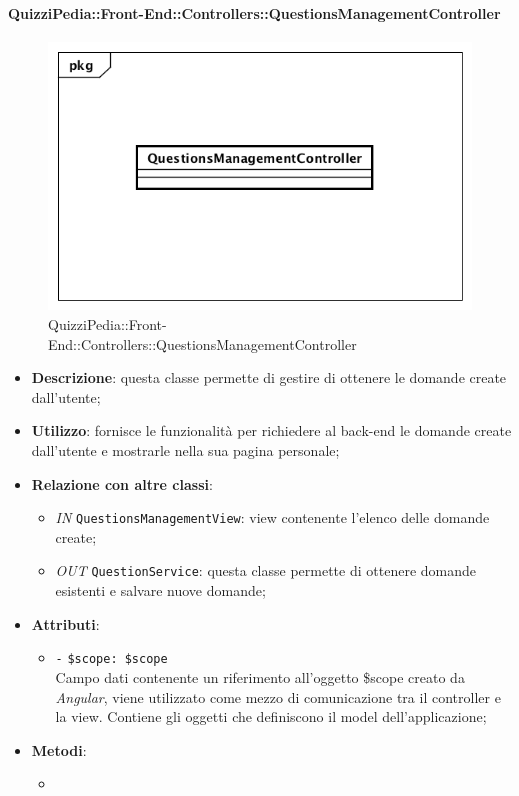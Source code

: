 \paragraph{QuizziPedia::Front-End::Controllers::QuestionsManagementController}
\begin{figure}
	\centering
	\includegraphics[scale=0.45]{UML/Classi/Front-End/QuizziPedia_Front-end_Controller_QuestionsManagementController.png}
	\caption{QuizziPedia::Front-End::Controllers::QuestionsManagementController}
\end{figure}
\begin{itemize}
	\item \textbf{Descrizione}: questa classe permette di gestire di ottenere le domande create dall'utente;
	\item \textbf{Utilizzo}: fornisce le funzionalità per richiedere al back-end le domande create dall'utente e mostrarle nella sua pagina personale; 
	\item \textbf{Relazione con altre classi}:
	\begin{itemize}
		\item \textit{IN} \texttt{QuestionsManagementView}: view contenente l'elenco delle domande create; 
		\item \textit{OUT} \texttt{QuestionService}: questa classe permette di ottenere domande esistenti e salvare nuove domande;
	\end{itemize}
	\item \textbf{Attributi}:
	\begin{itemize}
		\item \texttt{-} \texttt{\$scope: \$scope} \\
		Campo dati contenente un riferimento all’oggetto \$scope creato da \textit{Angular}, viene utilizzato come mezzo di comunicazione tra il controller e la view. Contiene gli oggetti che definiscono il model dell’applicazione;
	\end{itemize}
	\item \textbf{Metodi}:
	\begin{itemize}
		\item 
	\end{itemize}
\end{itemize}

